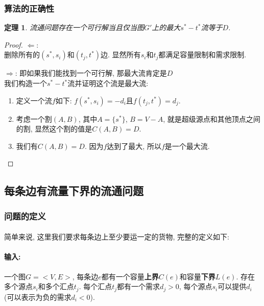 \documentclass[a4paper]{article}
\newtheorem*{theorem}{定理}
\begin{document}
       \subsubsection*{算法的正确性}
       \begin{theorem}
            流通问题存在一个可行解当且仅当图$G'$上的最大$s^*-t^*$流等于$D$.
        \end{theorem}
        \begin{proof}
        \item $\Leftarrow$: \\
删除所有的$(s^*,s_i)$和$(t_j,t^*)$边. 显然所有$s_i$和$t_j$都满足容量限制和需求限制.
        \item $\Rightarrow$: 即如果我们能找到一个可行解, 那最大流肯定是$D$ \\
我们构造一个$s^*-t^*$流并证明这个流是最大流:
\begin{enumerate}
\item 定义一个流$f$如下: $f(s^*,s_i)=-d_i$且$f(t_j, t^*)=d_j$. 
\item 考虑一个割$(A,B)$, 其中$A=\{s^*\}$, $B=V-A$, 就是超级源点和其他顶点之间的割, 显然这个割的值是$C(A,B)=D$.
\item 我们有$C(A,B)=D$. 因为$f$达到了最大, 所以$f$是一个最大流.
\end{enumerate}
        \end{proof}
        
        \subsection{每条边有流量下界的流通问题}
        \subsubsection*{问题的定义}
        \paragraph{}简单来说, 这里我们要求每条边上至少要运一定的货物, 完整的定义如下:
        \paragraph{输入: }一个图$G=<V, E>$, 每条边$e$都有一个容量{\bf 上界}$C(e)$和容量{\bf 下界}$L(e)$. 存在多个源点$s_i$和多个汇点$t_j$. 每个汇点$t_j$都有一个需求$d_j > 0$, 每个源点$s_i$可以提供$d_i$(可以表示为负的需求$d_i < 0$).
\end{document}
